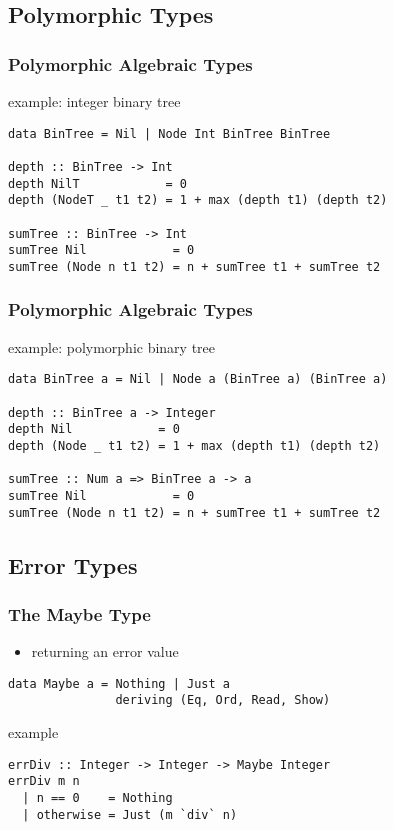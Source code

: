 \documentclass[dvipsnames]{beamer}
\theoremstyle{plain}
\begin{document}
\subsection{Polymorphic Types}

\begin{frame}[fragile]
  \frametitle{Polymorphic Algebraic Types}

  \begin{exampleblock}{example: integer binary tree}
    \begin{lstlisting}
data BinTree = Nil | Node Int BinTree BinTree

depth :: BinTree -> Int
depth NilT            = 0
depth (NodeT _ t1 t2) = 1 + max (depth t1) (depth t2)

sumTree :: BinTree -> Int
sumTree Nil            = 0
sumTree (Node n t1 t2) = n + sumTree t1 + sumTree t2
    \end{lstlisting}
  \end{exampleblock}
\end{frame}

\begin{frame}[fragile]
  \frametitle{Polymorphic Algebraic Types}

  \begin{exampleblock}{example: polymorphic binary tree}
    \begin{lstlisting}
data BinTree a = Nil | Node a (BinTree a) (BinTree a)

depth :: BinTree a -> Integer
depth Nil            = 0
depth (Node _ t1 t2) = 1 + max (depth t1) (depth t2)

sumTree :: Num a => BinTree a -> a
sumTree Nil            = 0
sumTree (Node n t1 t2) = n + sumTree t1 + sumTree t2
    \end{lstlisting}
  \end{exampleblock}
\end{frame}

\subsection{Error Types}

\begin{frame}[fragile]
  \frametitle{The Maybe Type}

  \begin{itemize}
    \item returning an error value
  \end{itemize}

  \begin{lstlisting}
data Maybe a = Nothing | Just a
               deriving (Eq, Ord, Read, Show)
  \end{lstlisting}

  \begin{exampleblock}{example}
    \begin{lstlisting}
errDiv :: Integer -> Integer -> Maybe Integer
errDiv m n
  | n == 0    = Nothing
  | otherwise = Just (m `div` n)
    \end{lstlisting}
  \end{exampleblock}
\end{frame}
\end{document}
